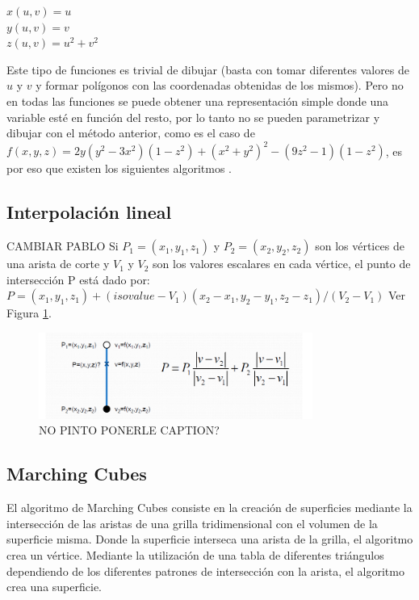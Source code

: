 \documentclass[12pt]{article}
\begin{document}
\begin{center}
$x(u,v) = u$\\
$y(u,v) = v$\\
$z(u,v) = u^2+v^2$\\
\end{center}

Este tipo de funciones es trivial de dibujar (basta con tomar diferentes valores de $u$ y $v$ y formar polígonos con las coordenadas obtenidas de los mismos).
Pero no en todas las funciones se puede obtener una representación simple donde una variable esté en función del resto, por lo tanto no se pueden parametrizar y dibujar con el método anterior, como es el caso de  $f(x,y,z) = 2y(y^2-3x^2)(1-z^2)+(x^2+y^2)^2-(9z^2-1)(1-z^2)$, es por eso que existen los siguientes algoritmos \cite{implicitas}.

\subsection{Interpolación lineal}
CAMBIAR PABLO
\noindent  Si $P_1=(x_1,y_1,z_1)$ y $P_2=(x_2,y_2,z_2)$ son los vértices de una arista de corte y $V_1$ y $V_2$ son los valores escalares en cada vértice, el punto de intersección P está dado por:
$P = (x_1,y_1,z_1) + (isovalue - V_1) (x_2-x_1,y_2-y_1,z_2-z_1) / (V_2 - V_1)$ Ver Figura \ref{sdkjasdlksdjkasljlasjlkas}.
\begin{figure}[h!]
\includegraphics[width=0.8\textwidth,center]{interpolacion.png}
\caption{NO PINTO PONERLE CAPTION?}
\label{sdkjasdlksdjkasljlasjlkas}
\end{figure}
\subsection{Marching Cubes}
\noindent El algoritmo de Marching Cubes\cite{marching}\cite{marchingcubes} consiste en la creación de superficies mediante la intersección de las aristas de una grilla tridimensional con el volumen de la superficie misma. Donde la superficie interseca una arista de la grilla, el algoritmo crea un vértice. Mediante la utilización de una tabla de diferentes triángulos dependiendo de los diferentes patrones de intersección con la arista, el algoritmo crea una superficie.
\end{document}
